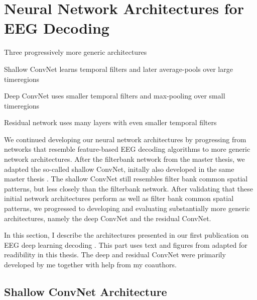 \chapter{Neural Network Architectures for
EEG Decoding}

\begin{startbox}{Three progressively more generic architectures}
\item Shallow ConvNet learns temporal filters and later average-pools over large timeregions
\item Deep ConvNet uses smaller temporal filters and max-pooling over small timeregions
\item Residual network uses many layers with even smaller temporal filters
\end{startbox}


We continued developing our neural network architectures by progressing from networks that resemble
feature-based EEG decoding algorithms to more generic network
architectures. After the filterbank network from the master thesis, we
adapted the so-called shallow ConvNet, initally also developed in the
same master thesis \citep{schirrmeister_msc_thesis_2015}.
The shallow ConvNet still resembles filter bank common spatial patterns,
but less closely than the filterbank network. After validating that
these initial network architectures perform as well as filter bank
common spatial patterns, we progressed to developing and evaluating
substantially more generic architectures, namely the deep ConvNet and
the residual ConvNet.

In this section, I describe the architectures presented in our first
publication on EEG deep learning decoding
\citep{schirrmeisterdeephbm2017}. This part uses text and
figures from \citep{schirrmeisterdeephbm2017} adapted for
readibility in this thesis. The deep and residual ConvNet were primarily
developed by me together with help from my coauthors.


    \hypertarget{shallow-convnet-architecture}{%
\section{Shallow ConvNet
Architecture}\label{shallow-convnet-architecture}}

% 

